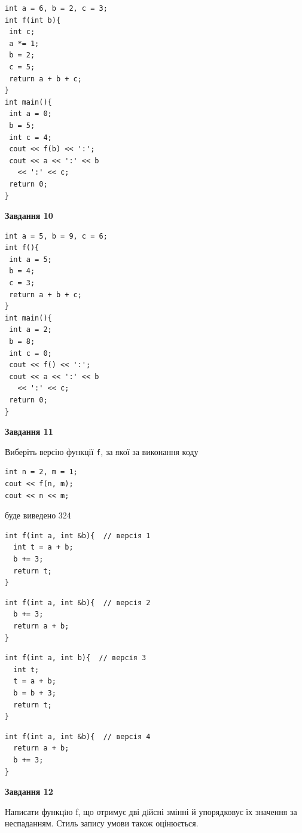 \documentclass[12pt, ukrainian]{article}
\def\code#1{\Verb!#1!}
\begin{document}
{\begin {large}
\begin{minipage}[t]{7.0cm}
\begin{verbatim}
int a = 6, b = 2, c = 3;
int f(int b){
 int c;
 a *= 1;
 b = 2;
 c = 5;
 return a + b + c;
}
int main(){
 int a = 0;
 b = 5;
 int c = 4;
 cout << f(b) << ':';
 cout << a << ':' << b 
   << ':' << c;
 return 0;
}
\end{verbatim}



\begin{center}
\textbf{Завдання 10}
\end{center}
\vspace{-8mm}

\begin{verbatim}
int a = 5, b = 9, c = 6;
int f(){
 int a = 5;
 b = 4;
 c = 3;
 return a + b + c;
}
int main(){
 int a = 2;
 b = 8;
 int c = 0;
 cout << f() << ':';
 cout << a << ':' << b 
   << ':' << c;
 return 0;
}
\end{verbatim}

\end{minipage}
\vline \hspace{1mm}
\begin{minipage}[t]{11.0cm}

\begin{center}
\textbf{Завдання 11}
\end{center}
Виберіть версію функції \code{f}, за якої за виконання коду
\begin{verbatim}
int n = 2, m = 1;
cout << f(n, m);
cout << n << m;
\end{verbatim}

буде виведено 324

\begin{verbatim}
int f(int a, int &b){  // версія 1
  int t = a + b;
  b += 3;
  return t;
}
\end{verbatim}

\vspace{-8mm}\begin{verbatim}
int f(int a, int &b){  // версія 2
  b += 3;
  return a + b;
}
\end{verbatim}

\vspace{-8mm}\begin{verbatim}
int f(int a, int b){  // версія 3
  int t;
  t = a + b;
  b = b + 3;
  return t;
}
\end{verbatim}

\vspace{-8mm}\begin{verbatim}
int f(int a, int &b){  // версія 4
  return a + b;
  b += 3;
}
\end{verbatim}



\begin{center}
\textbf{Завдання 12}
\end{center}

Написати функцiю f, що отримує дві дiйсні змінні й упорядковує їх значення за неспаданням. Стиль запису умови також оцінюється.\par

\end{minipage}

\end {large}}
\newpage
\end{document}
